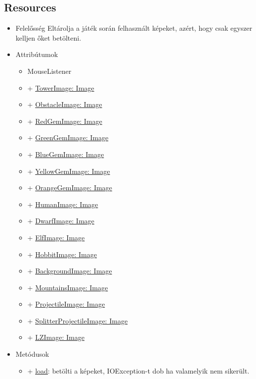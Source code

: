 \subsection{Resources}
\begin{itemize}
\item Felelősség  \newline
Eltárolja a játék során felhasznált képeket, azért, hogy csak egyszer kelljen őket betölteni.
\item Attribútumok
\begin{itemize}
	\item MouseListener
	\item + \underline{TowerImage: Image}
	\item + \underline{ObstacleImage: Image}
	\item + \underline{RedGemImage: Image}
	\item + \underline{GreenGemImage: Image}
	\item + \underline{BlueGemImage: Image}
	\item + \underline{YellowGemImage: Image}
	\item + \underline{OrangeGemImage: Image}
	\item + \underline{HumanImage: Image}
	\item + \underline{DwarfImage: Image}
	\item + \underline{ElfImage: Image}
	\item + \underline{HobbitImage: Image}
	\item + \underline{BackgroundImage: Image}
	\item + \underline{MountainsImage: Image}
	\item + \underline{ProjectileImage: Image}
	\item + \underline{SplitterProjectileImage: Image}
	\item + \underline{LZImage: Image}
\end{itemize}
\item Metódusok
	\begin{itemize}
		\item + \underline{load}: betölti a képeket, IOException-t dob ha valamelyik nem sikerült.
	\end{itemize}
\end{itemize}

